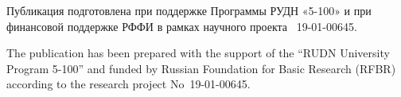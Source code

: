 \begin{Russian}
\def\acknowledgmentsname{Благодарности}
\end{Russian}

\begin{acknowledgments}


\begin{Russian}
Публикация подготовлена при поддержке Программы РУДН «5-100»
и при финансовой поддержке РФФИ в рамках научного проекта
\textnumero~19-01-00645.
%
\end{Russian}
\begin{English}
The publication has been prepared with the support of the ``RUDN University Program 5-100''
and funded by Russian Foundation for Basic Research (RFBR) according to the research project
No~19-01-00645.
%
\end{English}

\end{acknowledgments}



